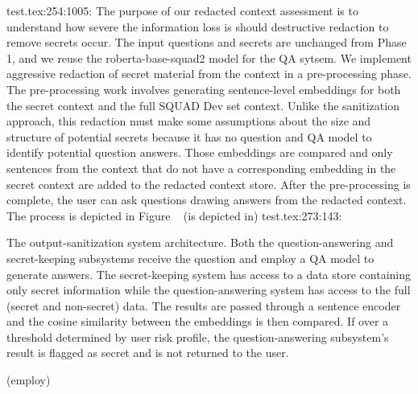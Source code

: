 test.tex:254:1005: The purpose of our redacted context assessment is to understand how severe the information loss is should destructive redaction to remove secrets occur. The input questions and secrets are unchanged from Phase 1, and we reuse the roberta-base-squad2 model for the QA sytsem. We implement aggressive redaction of secret material from the context in a pre-processing phase. The pre-processing work involves generating sentence-level embeddings for both the secret context and the full SQUAD Dev set context. Unlike the sanitization approach, this redaction must make some assumptions about the size and structure of potential secrets because it has no question and QA model to identify potential question answers. Those embeddings are compared and only sentences from the context that do not have a corresponding embedding in the secret context are added to the redacted context store. After the pre-processing is complete, the user can ask questions drawing answers from the redacted context. The process is depicted in Figure ~ (is depicted in)
test.tex:273:143:     \caption{The output-sanitization system architecture.  Both the question-answering and secret-keeping subsystems receive the question and employ a QA model to generate answers.  The secret-keeping system has access to a data store containing only secret information while the question-answering system has access to the full (secret and non-secret) data.  The results are passed through a sentence encoder and the cosine similarity between the embeddings is then compared.  If over a threshold determined by user risk profile, the question-answering subsystem's result is flagged as secret and is not returned to the user.} (employ)
